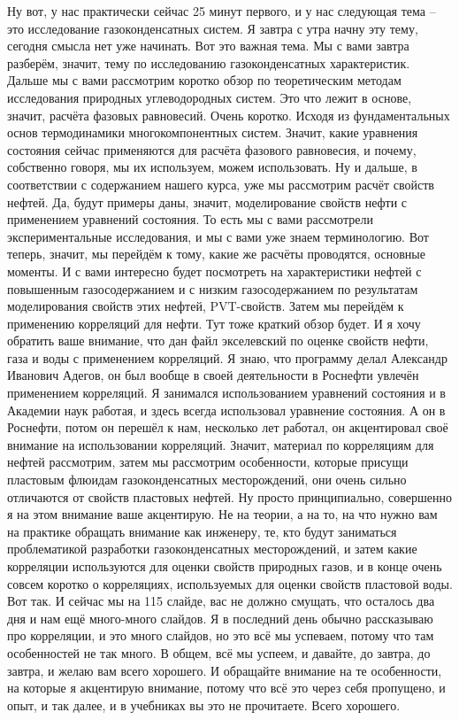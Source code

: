 \documentclass[main.tex]{subfiles}
\begin{document}
Ну вот, у нас практически сейчас 25 минут первого, и у нас следующая тема -- это исследование газоконденсатных систем.
Я завтра с утра начну эту тему, сегодня смысла нет уже начинать.
Вот это важная тема.
Мы с вами завтра разберём, значит, тему по исследованию газоконденсатных характеристик.
Дальше мы с вами рассмотрим коротко обзор по теоретическим методам исследования природных углеводородных систем.
Это что лежит в основе, значит, расчёта фазовых равновесий.
Очень коротко.
Исходя из фундаментальных основ термодинамики многокомпонентных систем.
Значит, какие уравнения состояния сейчас применяются для расчёта фазового равновесия, и почему, собственно говоря, мы их используем, можем использовать.
Ну и дальше, в соответствии с содержанием нашего курса, уже мы рассмотрим расчёт свойств нефтей.
Да, будут примеры даны, значит, моделирование свойств нефти с применением уравнений состояния.
То есть мы с вами рассмотрели экспериментальные исследования, и мы с вами уже знаем терминологию.
Вот теперь, значит, мы перейдём к тому, какие же расчёты проводятся, основные моменты.
И с вами интересно будет посмотреть на характеристики нефтей с повышенным газосодержанием и с низким газосодержанием по результатам моделирования свойств этих нефтей, PVT-свойств.
Затем мы перейдём к применению корреляций для нефти.
Тут тоже краткий обзор будет.
И я хочу обратить ваше внимание, что дан файл экселевский по оценке свойств нефти, газа и воды с применением корреляций.
Я знаю, что программу делал Александр Иванович Адегов, он был вообще в своей деятельности в Роснефти увлечён применением корреляций.
Я занимался использованием уравнений состояния и в Академии наук работая, и здесь всегда использовал уравнение состояния.
А он в Роснефти, потом он перешёл к нам, несколько лет работал, он акцентировал своё внимание на использовании корреляций.
Значит, материал по корреляциям для нефтей рассмотрим, затем мы рассмотрим особенности, которые присущи пластовым флюидам газоконденсатных месторождений, они очень сильно отличаются от свойств пластовых нефтей.
Ну просто принципиально, совершенно я на этом внимание ваше акцентирую.
Не на теории, а на то, на что нужно вам на практике обращать внимание как инженеру, те, кто будут заниматься проблематикой разработки газоконденсатных месторождений, и затем какие корреляции используются для оценки свойств природных газов, и в конце очень совсем коротко о корреляциях, используемых для оценки свойств пластовой воды.
Вот так.
И сейчас мы на 115 слайде, вас не должно смущать, что осталось два дня и нам ещё много-много слайдов.
Я в последний день обычно рассказываю про корреляции, и это много слайдов, но это всё мы успеваем, потому что там особенностей не так много.
В общем, всё мы успеем, и давайте, до завтра, до завтра, и желаю вам всего хорошего.
И обращайте внимание на те особенности, на которые я акцентирую внимание, потому что всё это через себя пропущено, и опыт, и так далее, и в учебниках вы это не прочитаете.
Всего хорошего.
\end{document}
